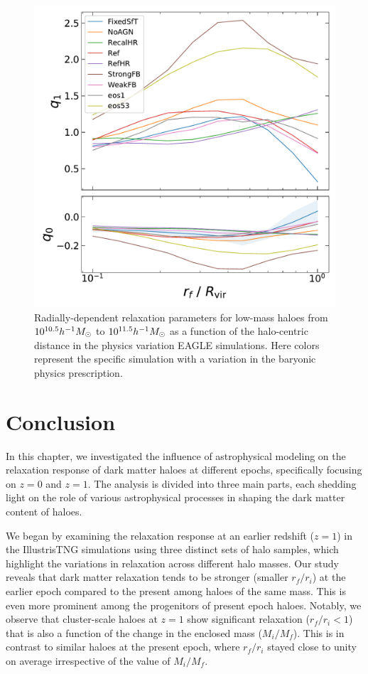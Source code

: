 \begin{figure}[htbp]
\centering
\includegraphics[width=0.7\linewidth]{plots/fit_params_rf_M_E_physvar_fatmass_uniradb.pdf}
\caption{Radially-dependent relaxation parameters for low-mass haloes from $10^{10.5} h^{-1}M_{\odot}$ to $10^{11.5} h^{-1}M_{\odot}$ as a function of the halo-centric distance in the physics variation EAGLE simulations. Here colors represent the specific simulation with a variation in the baryonic physics prescription.}
\label{fig:EAGLE-rad-dep}
\end{figure}


\section{Conclusion}
\label{sec:conclusion-ch:physvar}

In this chapter, we investigated the influence of astrophysical modeling on the relaxation response of dark matter haloes at different epochs, specifically focusing on \( z=0 \) and \( z=1 \). The analysis is divided into three main parts, each shedding light on the role of various astrophysical processes in shaping the dark matter content of haloes.

We began by examining the relaxation response at an earlier redshift (\( z=1 \)) in the IllustrisTNG simulations using three distinct sets of halo samples, which highlight the variations in relaxation across different halo masses. Our study reveals that dark matter relaxation tends to be stronger (smaller \( r_f/r_i \)) at the earlier epoch compared to the present among haloes of the same mass. This is even more prominent among the progenitors of present epoch haloes. Notably, we observe that cluster-scale haloes at \( z=1 \) show significant relaxation (\( r_f/r_i < 1 \)) that is also a function of the change in the enclosed mass (\( M_i/M_f \)). This is in contrast to similar haloes at the present epoch, where \( r_f/r_i \) stayed close to unity on average irrespective of the value of \( M_i/M_f \).

